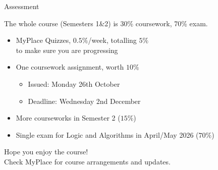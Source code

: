 \documentclass[xetex,aspectratio=169,14pt,hyperref={pdfpagelabels=true,pdflang={en-GB}}]{beamer}
\begin{document}
\begin{frame}
  {Assessment}

  The whole course (Semesters 1\&2) is 30\% coursework, 70\% exam.

  \bigskip

  \begin{itemize}
  \item MyPlace Quizzes, $0.5\%$/week, totalling $5\%$ \\
    \textcolor{black!60}{to make sure you are progressing}
  \item One coursework assignment, worth $10\%$
    \begin{itemize}
    \item Issued: Monday 26th October
    \item Deadline: Wednesday 2nd December
    \end{itemize}
  \item More courseworks in Semester 2 ($15\%$)
  \item Single exam for Logic and Algorithms in April/May 2026 ($70\%$)
  \end{itemize}

  \bigskip


\end{frame}

\begin{frame}
  \begin{center}
    {\Huge Hope you enjoy the course!} \\
    Check MyPlace for course arrangements and updates.
  \end{center}
\end{frame}
\end{document}
